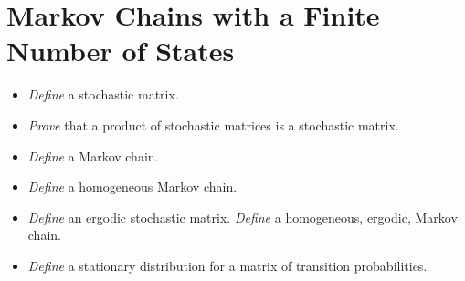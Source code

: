 \documentclass{article}
\newcommand{\cold}{{\color{babyblue}{\Snowflake}}}
\begin{document}
\section{Markov Chains with a Finite Number of States}
\begin{itemize}[nosep]
    \item[\cold] \textit{Define} a stochastic matrix. 
    \item[\cold] \textit{Prove} that a product of stochastic matrices is a stochastic matrix. 
    \item[\cold] \textit{Define} a Markov chain.
    \item[\cold] \textit{Define} a homogeneous Markov chain.
    \item[\cold] \textit{Define} an ergodic stochastic matrix. \textit{Define} a homogeneous, ergodic, Markov chain.
    \item[\cold] \textit{Define} a stationary distribution for a matrix of transition probabilities. 
\end{itemize}
\end{document}
